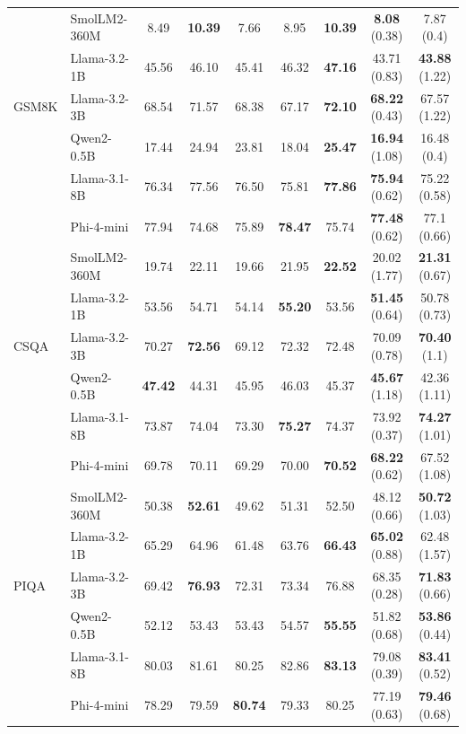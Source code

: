 \begin{table}[t!]
{\begin{tabular}{llccccccc}
\multirow{5}{*}{GSM8K} & SmolLM2-360M    
& 8.49  & \textbf{10.39} & 7.66 & 8.95 & \textbf{10.39} & \textbf{8.08} \tiny{(0.38)} & 7.87 \tiny{(0.4)}  \\
& Llama-3.2-1B  & 45.56 & 46.10 & 45.41 & 46.32 & \textbf{47.16} & 43.71 \tiny{(0.83)} & \textbf{43.88} \tiny{(1.22)} \\
& Llama-3.2-3B  & 68.54 & 71.57 & 68.38 & 67.17 & \textbf{72.10} & \textbf{68.22} \tiny{(0.43)} & 67.57 \tiny{(1.22)} \\
& Qwen2-0.5B  & 17.44 & 24.94 & 23.81 & 18.04 & \textbf{25.47} & \textbf{16.94} \tiny{(1.08)} & 16.48 \tiny{(0.4)} \\
& Llama-3.1-8B  & 76.34 & 77.56 & 76.50 & 75.81 & \textbf{77.86} & \textbf{75.94} \tiny{(0.62)} & 75.22 \tiny{(0.58)} \\
& Phi-4-mini & 77.94 & 74.68 & 75.89 & \textbf{78.47} & 75.74 & \textbf{77.48} \tiny{(0.62)} & 77.1 \tiny{(0.66)} \\

\midrule
\multirow{5}{*}{CSQA} & SmolLM2-360M    
& 19.74 & 22.11 & 19.66 & 21.95 & \textbf{22.52} & 20.02 \tiny{(1.77)} &  \textbf{21.31} \tiny{(0.67)} \\
& Llama-3.2-1B  & 53.56 & 54.71 & 54.14 & \textbf{55.20} & 53.56 & \textbf{51.45} \tiny{(0.64)} & 50.78 \tiny{(0.73)} \\
& Llama-3.2-3B  & 70.27 & \textbf{72.56} & 69.12 & 72.32 & 72.48 & 70.09 \tiny{(0.78)} & \textbf{70.40} \tiny{(1.1)} \\
& Qwen2-0.5B  & \textbf{47.42} & 44.31 & 45.95 & 46.03 & 45.37 & \textbf{45.67} \tiny{(1.18)} & 42.36 \tiny{(1.11)} \\
& Llama-3.1-8B  & 73.87 & 74.04 & 73.30 & \textbf{75.27} & 74.37 & 73.92 \tiny{(0.37)} & \textbf{74.27} \tiny{(1.01)} \\
& Phi-4-mini & 69.78 & 70.11 & 69.29 & 70.00 & \textbf{70.52} & \textbf{68.22} \tiny{(0.62)} & 67.52 \tiny{(1.08)} \\

\midrule
\multirow{5}{*}{PIQA} & SmolLM2-360M    
& 50.38 & \textbf{52.61} & 49.62 & 51.31 & 52.50 & 48.12 \tiny{(0.66)} & \textbf{50.72} \tiny{(1.03)}  \\
& Llama-3.2-1B  & 65.29 & 64.96 & 61.48 & 63.76 & \textbf{66.43} & \textbf{65.02} \tiny{(0.88)} & 62.48 \tiny{(1.57)} \\
& Llama-3.2-3B  & 69.42 & \textbf{76.93} & 72.31 & 73.34 & 76.88 & 68.35 \tiny{(0.28)} & \textbf{71.83} \tiny{(0.66)} \\
& Qwen2-0.5B  & 52.12 & 53.43 & 53.43 & 54.57 & \textbf{55.55} & 51.82 \tiny{(0.68)} & \textbf{53.86} \tiny{(0.44)} \\
& Llama-3.1-8B  & 80.03 & 81.61 & 80.25 & 82.86 & \textbf{83.13} & 79.08 \tiny{(0.39)} & \textbf{83.41} \tiny{(0.52)} \\
& Phi-4-mini & 78.29 & 79.59 & \textbf{80.74} & 79.33 & 80.25 & 77.19 \tiny{(0.63)} & \textbf{79.46} \tiny{(0.68)} \\

\bottomrule
\end{tabular}
}
\label{tab:main_table}
\end{table}
